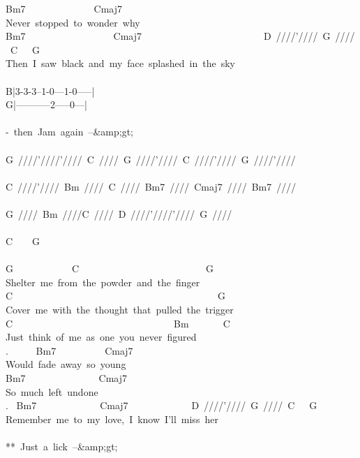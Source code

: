 {Bm7\ \ \ \ \ \ \ \ \ \ \ \ \ \ Cmaj7\\
Never\ stopped\ to\ wonder\ why\\
Bm7\ \ \ \ \ \ \ \ \ \ \ \ \ \ \ \ \ \ Cmaj7\ \ \ \ \ \ \ \ \ \ \ \ \ \ \ \ \ \ \ \ \ \ \ \ \ D\ ////'////\ G\ ////\ C\ \ \ G\\
Then\ I\ saw\ black\ and\ my\ face\ splashed\ in\ the\ sky\\
\\
B|3-3-3--1-0---1-0-----|\\
G|-----------2-----0---|\\
\\
-\ then\ Jam\ again\ --\&amp;gt;\\
\\
G\ ////'////'////\ C\ ////\ G\ ////'////\ C\ ////'////\ G\ ////'////\\
\\
C\ ////'////\ Bm\ ////\ C\ ////\ Bm7\ ////\ Cmaj7\ ////\ Bm7\ ////\\
\\
G\ ////\ Bm\ ////C\ ////\ D\ ////'////'////\ G\ ////\\
\\
C\ \ \ \ G\\
\\
G\ \ \ \ \ \ \ \ \ \ \ \ C\ \ \ \ \ \ \ \ \ \ \ \ \ \ \ \ \ \ \ \ \ \ \ \ \ \ G\\
Shelter\ me\ from\ the\ powder\ and\ the\ finger\\
C\ \ \ \ \ \ \ \ \ \ \ \ \ \ \ \ \ \ \ \ \ \ \ \ \ \ \ \ \ \ \ \ \ \ \ \ \ \ \ \ \ \ G\\
Cover\ me\ with\ the\ thought\ that\ pulled\ the\ trigger\\
C\ \ \ \ \ \ \ \ \ \ \ \ \ \ \ \ \ \ \ \ \ \ \ \ \ \ \ \ \ \ \ \ \ Bm\ \ \ \ \ \ \ C\\
Just\ think\ of\ me\ as\ one\ you\ never\ figured\\
. \ \ \ \ \ Bm7\ \ \ \ \ \ \ \ \ \ Cmaj7\\
Would\ fade\ away\ so\ young\\
Bm7\ \ \ \ \ \ \ \ \ \ \ \ \ \ \ Cmaj7\\
So\ much\ left\ undone\\
. \ Bm7\ \ \ \ \ \ \ \ \ \ \ \ \ Cmaj7\ \ \ \ \ \ \ \ \ \ \ \ \ D\ ////'////\ G\ ////\ C\ \ \ G\\
Remember\ me\ to\ my\ love,\ I\ know\ I'll\ miss\ her\\
\\
**\ Just\ a\ lick\ --\&amp;gt;\\
}
